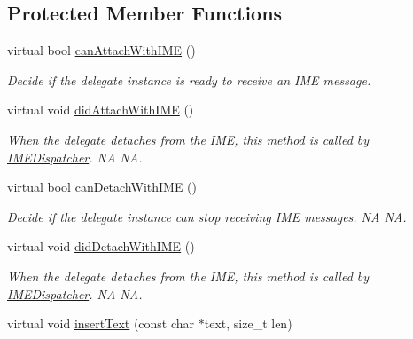\subsection*{Protected Member Functions}
\begin{DoxyCompactItemize}
\item 
virtual bool \hyperlink{classIMEDelegate_aa9e6c77460b633214759a779c16767f6}{can\+Attach\+With\+I\+ME} ()
\begin{DoxyCompactList}\small\item\em Decide if the delegate instance is ready to receive an I\+ME message. \end{DoxyCompactList}\item 
\mbox{\label{classIMEDelegate_a2eda6a016024c1b14d58e19df6d269fb}} 
virtual void \hyperlink{classIMEDelegate_a2eda6a016024c1b14d58e19df6d269fb}{did\+Attach\+With\+I\+ME} ()
\begin{DoxyCompactList}\small\item\em When the delegate detaches from the I\+ME, this method is called by \hyperlink{classIMEDispatcher}{I\+M\+E\+Dispatcher}.  NA  NA. \end{DoxyCompactList}\item 
\mbox{\label{classIMEDelegate_a033e4ac8009c60cd41bf73430682fcb4}} 
virtual bool \hyperlink{classIMEDelegate_a033e4ac8009c60cd41bf73430682fcb4}{can\+Detach\+With\+I\+ME} ()
\begin{DoxyCompactList}\small\item\em Decide if the delegate instance can stop receiving I\+ME messages.  NA  NA. \end{DoxyCompactList}\item 
\mbox{\label{classIMEDelegate_a6d8edd36c2380852f6b1fa6cf58c1879}} 
virtual void \hyperlink{classIMEDelegate_a6d8edd36c2380852f6b1fa6cf58c1879}{did\+Detach\+With\+I\+ME} ()
\begin{DoxyCompactList}\small\item\em When the delegate detaches from the I\+ME, this method is called by \hyperlink{classIMEDispatcher}{I\+M\+E\+Dispatcher}.  NA  NA. \end{DoxyCompactList}\item 
\mbox{\label{classIMEDelegate_a922478054b2ee9b5a0d57f6837435506}} 
virtual void \hyperlink{classIMEDelegate_a922478054b2ee9b5a0d57f6837435506}{insert\+Text} (const char $\ast$text, size\+\_\+t len)

\end{DoxyCompactItemize}
